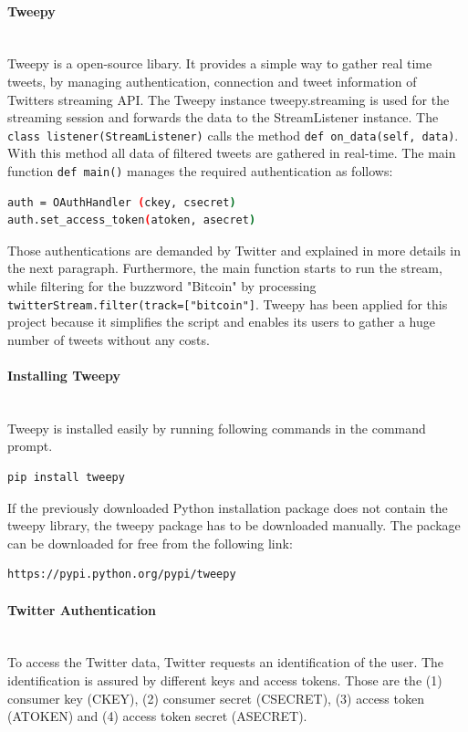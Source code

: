 \documentclass[a4paper,12pt]{article}
\begin{document}
\begin{spacing}{1.2}
\paragraph{Tweepy}\mbox{}\\{}
Tweepy is a open-source libary. It provides a simple way to gather real time tweets, by managing authentication, connection and tweet information of Twitters streaming API. The Tweepy instance tweepy.streaming is used for the streaming session and forwards the data to the StreamListener instance. The \verb|class listener(StreamListener)| calls the method \verb|def on_data(self, data)|. With this method all data of filtered tweets are gathered in real-time. \parencite{tweepy} The main function \verb|def main()| manages the required authentication as follows:
\begin{lstlisting}[language=bash]
auth = OAuthHandler (ckey, csecret)
auth.set_access_token(atoken, asecret)
\end{lstlisting}
Those authentications are demanded by Twitter and explained in more details in the next paragraph. Furthermore, the main function starts to run the stream, while filtering for the buzzword "Bitcoin" by processing \verb|twitterStream.filter(track=["bitcoin"]|. Tweepy has been applied for this project because it simplifies the script and enables its users to gather a huge number of tweets without any costs. 


\paragraph{Installing Tweepy}\mbox{}\\{}
Tweepy is installed easily by running following commands in the command prompt. 
\begin{lstlisting}[language=bash]
pip install tweepy
\end{lstlisting}

If the previously downloaded Python installation package does not contain the tweepy library, the tweepy package has to be downloaded manually. The package can be downloaded for free from the following link:
\begin{lstlisting}[language=bash]
https://pypi.python.org/pypi/tweepy
\end{lstlisting}

\paragraph{Twitter Authentication}\mbox{}\\{}
To access the Twitter data, Twitter requests an identification of the user. The identification is assured by different keys and access tokens. Those are the (1) consumer key (CKEY), (2) consumer secret (CSECRET), (3) access token (ATOKEN) and (4) access token secret (ASECRET). \parencite{twitterinc2017b}


\end{spacing}
\end{document}
